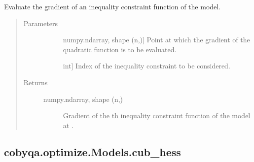 \documentclass[letterpaper,10pt,english]{sphinxmanual}
\begin{document}
\begin{fulllineitems}
\begin{fulllineitems}
\label{\detokenize{refs/generated/cobyqa.optimize.Models.cub_grad:cobyqa.optimize.Models.cub_grad}}
\sphinxAtStartPar
Evaluate the gradient of an inequality constraint function of the model.
\begin{quote}\begin{description}
\item[{Parameters}] \leavevmode\begin{description}
\item[{}] \leavevmode{[}numpy.ndarray, shape (n,){]}
\sphinxAtStartPar
Point at which the gradient of the quadratic function is to be
evaluated.

\item[{}] \leavevmode{[}int{]}
\sphinxAtStartPar
Index of the inequality constraint to be considered.

\end{description}

\item[{Returns}] \leavevmode\begin{description}
\item[{numpy.ndarray, shape (n,)}] \leavevmode
\sphinxAtStartPar
Gradient of the \sphinxhyphen{}th inequality constraint function of the model
at .

\end{description}

\end{description}\end{quote}

\end{fulllineitems}



\subsection{cobyqa.optimize.Models.cub\_hess}
\label{\detokenize{refs/generated/cobyqa.optimize.Models.cub_hess:cobyqa-optimize-models-cub-hess}}\label{\detokenize{refs/generated/cobyqa.optimize.Models.cub_hess::doc}}


\end{fulllineitems}
\end{document}
